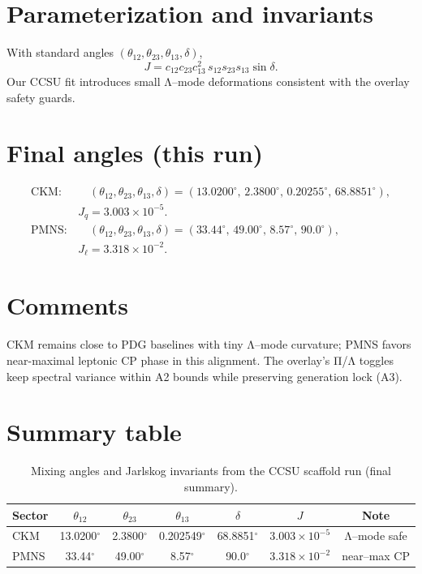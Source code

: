\section*{Parameterization and invariants}
With standard angles $(\theta_{12},\theta_{23},\theta_{13},\delta)$,
\[
J=c_{12}c_{23}c_{13}^2\,s_{12}s_{23}s_{13}\sin\delta .
\]
Our CCSU fit introduces small Λ–mode deformations consistent with the overlay safety guards.

\section*{Final angles (this run)}
\begin{align*}
\mathrm{CKM}:&\quad
(\theta_{12},\theta_{23},\theta_{13},\delta)
=(13.0200^\circ,\,2.3800^\circ,\,0.20255^\circ,\,68.8851^\circ),\\
& J_q = 3.003\times 10^{-5}.\\[4pt]
\mathrm{PMNS}:&\quad
(\theta_{12},\theta_{23},\theta_{13},\delta)
=(33.44^\circ,\,49.00^\circ,\,8.57^\circ,\,90.0^\circ),\\
& J_\ell = 3.318\times 10^{-2}.
\end{align*}

\section*{Comments}
CKM remains close to PDG baselines with tiny Λ–mode curvature; PMNS favors near-maximal leptonic CP phase in this alignment. The overlay’s Π/Λ toggles keep spectral variance within A2 bounds while preserving generation lock (A3).
\section*{Summary table}
\begin{table}[ht]
\centering
\begin{tabular}{lcccccc}
\toprule
Sector & $\theta_{12}$ & $\theta_{23}$ & $\theta_{13}$ & $\delta$ & $J$ & Note\\
\midrule
CKM & 13.0200$^\circ$ & 2.3800$^\circ$ & 0.202549$^\circ$ & 68.8851$^\circ$ & $3.003\times10^{-5}$ & Λ–mode safe\\
PMNS & 33.44$^\circ$ & 49.00$^\circ$ & 8.57$^\circ$ & 90.0$^\circ$ & $3.318\times10^{-2}$ & near–max CP\\
\bottomrule
\end{tabular}
\caption{Mixing angles and Jarlskog invariants from the CCSU scaffold run (final summary).}
\label{tab:ckm-pmns-summary}
\end{table}
